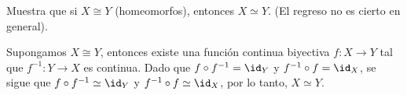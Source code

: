 \begin{ejercicio}
        Muestra que si $X\cong Y$ (homeomorfos), entonces $X\simeq Y$. (El regreso no es cierto en general).
    \end{ejercicio}

\begin{demostracion}
    Supongamos $X\cong Y$, entonces existe una función continua biyectiva $f:X\to Y$ tal que $f^{-1}:Y\to X$ es continua. Dado que $f\circ f^{-1}=\id_Y$ y $f^{-1}\circ f=\id_X$, se sigue que $f\circ f^{-1}\simeq\id_Y$ y $f^{-1}\circ f\simeq\id_X$, por lo tanto, $X\simeq Y.$
\end{demostracion}
